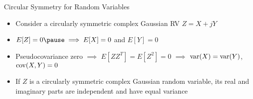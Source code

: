 \documentclass[t]{beamer}
\newcommand{\cov}{\operatornamewithlimits{cov}}
\newcommand{\var}{\operatornamewithlimits{var}}
\begin{document}
\begin{frame}{Circular Symmetry for Random Variables}
  \footnotesize
  \begin{itemize}
    \item \pause Consider a circularly symmetric complex Gaussian RV $Z = X+jY$
    \item \pause $E[Z] = 0 \pause \implies E[X] = 0$ \pause and $E[Y] = 0$
    \item \pause Pseudocovariance zero $\implies$ \pause $E[ZZ^T] = E[Z^2] = 0$ \pause $\implies$ \pause $\var(X) = \var(Y)$, \pause $\cov(X,Y) = 0$
    \item \pause If $Z$ is a circularly symmetric complex Gaussian random variable, its real and imaginary parts are \pause independent and \pause have equal variance
  \end{itemize}
  \normalsize
\end{frame}
\end{document}
